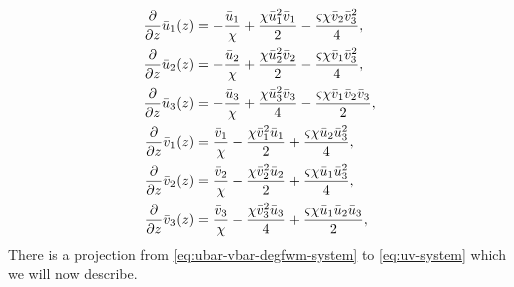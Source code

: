 \documentclass[11pt,a4paper]{article}
\numberwithin{equation}{section}
\begin{document}
\begin{align}
  \frac{\partial}{\partial z} \bar{u}_1(z) &=  - \frac{\bar{u}_1}{\chi} + \frac{\chi \bar{u}_1^{2} \bar{v}_1}{2} - \frac{\varsigma \chi \bar{v}_2 \bar{v}_3^{2}}{4}, \notag \\
  \frac{\partial}{\partial z} \bar{u}_2(z) &=  - \frac{\bar{u}_2}{\chi} + \frac{\chi \bar{u}_2^{2} \bar{v}_2}{2} - \frac{\varsigma \chi \bar{v}_1 \bar{v}_3^{2}}{4}, \notag \\
  \frac{\partial}{\partial z} \bar{u}_3(z) &=  - \frac{\bar{u}_3}{\chi} + \frac{\chi \bar{u}_3^{2} \bar{v}_3}{4} - \frac{\varsigma \chi \bar{v}_1 \bar{v}_2 \bar{v}_3}{2}, \notag \\
  \frac{\partial}{\partial z} \bar{v}_1(z) &= \frac{\bar{v}_1}{\chi} - \frac{\chi \bar{v}_1^{2} \bar{u}_1}{2} + \frac{\varsigma \chi \bar{u}_2 \bar{u}_3^{2}}{4}, \notag \\
  \frac{\partial}{\partial z} \bar{v}_2(z) &= \frac{\bar{v}_2}{\chi} - \frac{\chi \bar{v}_2^{2} \bar{u}_2}{2} + \frac{\varsigma \chi \bar{u}_1 \bar{u}_3^{2}}{4}, \notag \\
  \frac{\partial}{\partial z} \bar{v}_3(z) &= \frac{\bar{v}_3}{\chi} - \frac{\chi \bar{v}_3^{2} \bar{u}_3}{4} + \frac{\varsigma \chi \bar{u}_1 \bar{u}_2 \bar{u}_3}{2}, \label{eq:ubar-vbar-degfwm-system}
\end{align}
There is a projection from \eqref{eq:ubar-vbar-degfwm-system} to \eqref{eq:uv-system} which we will now describe.
\end{document}
